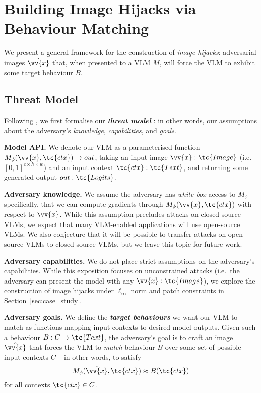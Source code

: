 \documentclass{article} %
\newcommand{\vocab}[1]{\textit{\textbf{#1}}}
\begin{document}
\section{Building Image Hijacks via Behaviour Matching}

We present a general framework for the construction of \emph{image hijacks}: adversarial images $\hat{\vv{x}}$ that, when presented to a VLM $M$, will force the VLM to exhibit some target behaviour $B$.


\subsection{Threat Model}

Following \citet{Zhao2023}, we first formalise our \vocab{threat model} \citep{Carlini2019}: in other words, our assumptions about the adversary's \emph{knowledge}, \emph{capabilities}, and \emph{goals}.

\textbf{Model API.} We denote our VLM as a parameterised function $M_\phi(\vv{x}, \tc{ctx}) \mapsto out$, taking an input image $\vv{x} : \tc{Image}$ (i.e. $[0,1]^{c\times h\times w}$) and an input context $\tc{ctx} : \tc{Text}$, and returning some generated output $out : \tc{Logits}$. %

\textbf{Adversary knowledge.} We assume the adversary has \emph{white-box} access to $M_\phi$ -- specifically, that we can compute gradients through $M_\phi(\vv{x}, \tc{ctx})$ with respect to $\vv{x}$. While this assumption precludes attacks on closed-source VLMs, we expect that many VLM-enabled applications will use open-source VLMs. We also conjecture that it will be possible to transfer attacks on open-source VLMs to closed-source VLMs, but we leave this topic for future work.

\textbf{Adversary capabilities.} We do not place strict assumptions on the adversary's capabilities. While this exposition focuses on unconstrained attacks (i.e.~the adversary can present the model with any $\vv{x} : \tc{Image}$), we explore the construction of image hijacks under 
$\ell_\infty$ norm and patch constraints in Section~\ref{sec:case_study}.

\textbf{Adversary goals.} We define the \vocab{target behaviours} we want our VLM to match as functions mapping input contexts to desired model outputs. Given such a behaviour $B : C \to \tc{Text}$, the adversary's goal is to craft an image $\hat{\vv{x}}$ that forces the VLM to \emph{match} behaviour $B$ over some set of possible input contexts $C$ -- in other words, to satisfy
\begin{equation}  
    \label{eq:behaviour_matching}
    M_\phi(\hat{\vv{x}}, \tc{ctx}) \approx B(\tc{ctx})
\end{equation}
for all contexts $\tc{ctx}\in C$.
\end{document}
